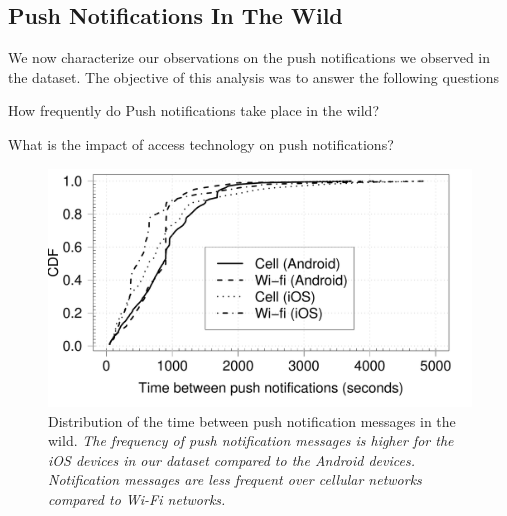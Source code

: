\subsection{Push Notifications In The Wild} 

We now characterize our observations on the push notifications we observed in the \moball dataset. 
The objective of this analysis was to answer the following questions
\begin{packedenumerate}
\item How frequently do Push notifications take place in the wild?
\item What is the impact of access technology on push notifications?
\item {}	
\item {}
\item {}
\end{packedenumerate}

\begin{figure}
\includegraphics[width=\columnwidth]{plots/cdf_push_comparison_device_wild.pdf}
\caption{Distribution of the time between push notification messages in the wild. \emph{The frequency of push notification messages is higher for the iOS devices in our dataset compared to the Android devices. Notification messages are less frequent over cellular networks compared to Wi-Fi networks.}}
\label{fig:wild-cdf-push}
\end{figure}

